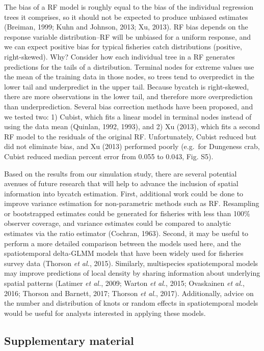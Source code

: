 \documentclass[]{article}
\begin{document}
The bias of a RF model is roughly equal to the bias of the individual
regression trees it comprises, so it should not be expected to produce
unbiased estimates (Breiman, 1999; Kuhn and Johnson, 2013; Xu, 2013). RF
bias depends on the response variable distribution--RF will be unbiased
for a uniform response, and we can expect positive bias for typical
fisheries catch distributions (positive, right-skewed). Why? Consider
how each individual tree in a RF generates predictions for the tails of
a distribution. Terminal nodes for extreme values use the mean of the
training data in those nodes, so trees tend to overpredict in the lower
tail and underpredict in the upper tail. Because bycatch is
right-skewed, there are more observations in the lower tail, and
therefore more overprediction than underprediction. Several bias
correction methods have been proposed, and we tested two: 1) Cubist,
which fits a linear model in terminal nodes instead of using the data
mean (Quinlan, 1992, 1993), and 2) Xu (2013), which fits a second RF
model to the residuals of the original RF. Unfortunately, Cubist reduced
but did not eliminate bias, and Xu (2013) performed poorly (e.g.~for
Dungeness crab, Cubist reduced median percent error from 0.055 to 0.043,
Fig. S5).

Based on the results from our simulation study, there are several
potential avenues of future research that will help to advance the
inclusion of spatial information into bycatch estimation. First,
additional work could be done to improve variance estimation for
non-parametric methods such as RF. Resampling or bootstrapped estimates
could be generated for fisheries with less than 100\% observer coverage,
and variance estimates could be compared to analytic estimates via the
ratio estimator (Cochran, 1963). Second, it may be useful to perform a
more detailed comparison between the models used here, and the
spatiotemporal delta-GLMM models that have been widely used for
fisheries survey data (Thorson \emph{et al.}, 2015). Similarly,
multispecies spatiotemporal models may improve predictions of local
density by sharing information about underlying spatial patterns
(Latimer \emph{et al.}, 2009; Warton \emph{et al.}, 2015; Ovaskainen
\emph{et al.}, 2016; Thorson and Barnett, 2017; Thorson \emph{et al.},
2017). Additionally, advice on the number and distribution of knots or
random effects in spatiotemporal models would be useful for analysts
interested in applying these models.

\hypertarget{supplementary-material}{%
\subsection{Supplementary material}\label{supplementary-material}}
\end{document}
